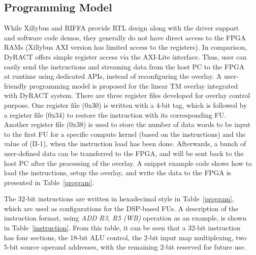\subsection{Programming Model}
While Xillybus and RIFFA provide RTL design along with the driver support and software code demos, they generally do not have direct access to the FPGA RAMs (Xillybus AXI version has limited access to the registers). 
In comparison, DyRACT offers simple register access via the AXI-Lite interface. 
Thus,  user can easily send the instructions and streaming data from the host PC to the FPGA at runtime using dedicated APIs, instead of reconfiguring the overlay. 
A user-friendly programming model is proposed for the linear TM overlay integrated with DyRACT system. 
There are three register files developed for overlay control purpose. 
One register file (0x30) is written with a 4-bit tag, which is followed by a register file (0x34) to restore the instruction with its corresponding FU. 
Another register file (0x38) is used to store the number of data words to be input to the first FU for a specific compute kernel (based on the instructions) and the value of (II-1), when the instruction load has been done. 
Afterwards, a bunch of user-defined data can be transferred to the FPGA, and will be sent back to the host PC after the processing of the overlay. 
A snippet example code shows how to load the instructions, setup the overlay, and write the data to the FPGA is presented in Table~\ref{program}. 



The 32-bit instructions are written in hexadecimal style in Table~\ref{program}, which are used as configurations for the DSP-based FUs. 
A description of the instruction format, using \textit{ADD R3, R5 (WB)} operation as an example, is shown in Table~\ref{instruction}. 
From this table, it can be seen that a 32-bit instruction has four sections, the 18-bit ALU control, the 2-bit input map multiplexing, two 5-bit source operand addresses, with the remaining 2-bit reserved for future use. 



